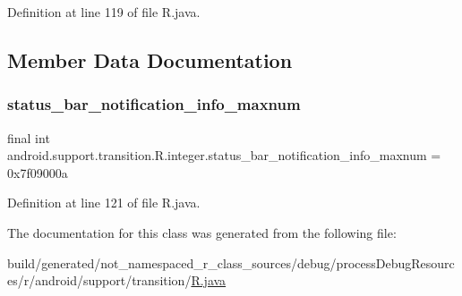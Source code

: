 Definition at line 119 of file R.\+java.


\begin{DoxyCode}{0}

\end{DoxyCode}


\subsection{Member Data Documentation}
\mbox{\label{classandroid_1_1support_1_1transition_1_1_r_1_1integer_a16b7d2020f81686d87ad20ae20652f64}} 
\subsubsection{\texorpdfstring{status\_bar\_notification\_info\_maxnum}{status\_bar\_notification\_info\_maxnum}}
{\footnotesize\ttfamily final int android.\+support.\+transition.\+R.\+integer.\+status\+\_\+bar\+\_\+notification\+\_\+info\+\_\+maxnum = 0x7f09000a\hspace{0.3cm}{\ttfamily [static]}}



Definition at line 121 of file R.\+java.



The documentation for this class was generated from the following file\+:\begin{DoxyCompactItemize}
\item 
build/generated/not\+\_\+namespaced\+\_\+r\+\_\+class\+\_\+sources/debug/process\+Debug\+Resources/r/android/support/transition/\mbox{\hyperlink{android_2support_2transition_2_r_8java}{R.\+java}}\end{DoxyCompactItemize}
